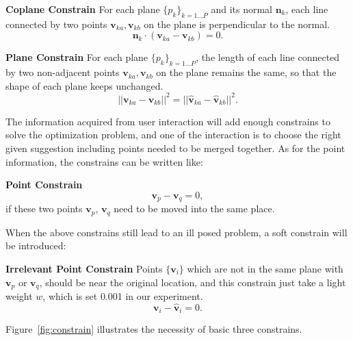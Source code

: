 \noindent
\textbf{Coplane Constrain} For each plane $\{p_k\}_{k=1 \dots P}$ and its normal $\mathbf{n}_k$, each line connected by two points $\mathbf{v}_{ka}, \mathbf{v}_{kb}$ on the plane is perpendicular to the normal.
\begin{equation}
\mathbf{n}_k \cdot (\mathbf{v}_{ka} - \mathbf{v}_{kb}) = 0.
\label{equ:coplane}
\end{equation}

\noindent
\textbf{Plane Constrain} For each plane $\{p_k\}_{k=1 \dots P}$, the length of each line connected by two non-adjacent points $\mathbf{v}_{ka}, \mathbf{v}_{kb}$ on the plane remains the same, so that the shape of each plane keeps unchanged.
\begin{equation}
||\mathbf{v}_{ka} - \mathbf{v}_{kb}||^2 = ||\hat{\mathbf{v}}_{ka} - \hat{\mathbf{v}}_{kb}||^2.
\label{equ:plane}
\end{equation}

The information acquired from user interaction will add enough constrains to solve the optimization problem, and one of the interaction is to choose the right given suggestion including points needed to be merged together. As for the point information, the constrains can be written like:

\noindent
\textbf{Point Constrain} 
\begin{equation}
\mathbf{v}_p - \mathbf{v}_q = 0,
\label{equ:point}
\end{equation}
if these two points $\mathbf{v}_p$, $\mathbf{v}_q$ need to be moved into the same place.

When the above constrains still lead to an ill posed problem, a soft constrain will be introduced:

\noindent
\textbf{Irrelevant Point Constrain} Points $\{\mathbf{v}_i\}$ which are not in the same plane with $\mathbf{v}_p$ or $\mathbf{v}_q$, should be near the original location, and this constrain just take a light weight $w$, which is set 0.001 in our experiment. 
\begin{equation}
\mathbf{v}_i - \mathbf{\hat{v}}_i = 0.
\label{equ:irrelevant}
\end{equation}

Figure~\ref{fig:constrain} illustrates the necessity of basic three constrains.

